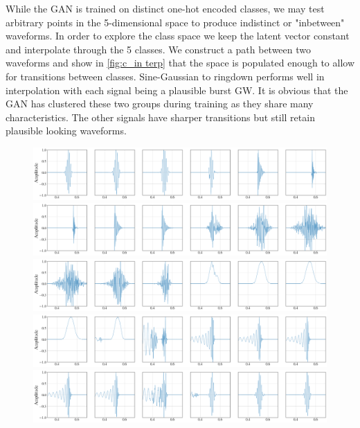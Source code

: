 \documentclass[12pt]{iopart}
\begin{document}
While the \ac{GAN} is trained on distinct one-hot encoded classes, we may test arbitrary points in the 5-dimensional space to produce indistinct or "inbetween" waveforms. In order to explore the class space we keep the latent vector constant and
interpolate through the 5 classes. We construct a path between two waveforms
and show in \cref{fig:c_in	terp} that the space is populated enough to allow for transitions between
classes.  Sine-Gaussian to ringdown performs well in interpolation with each
signal being a plausible burst GW. It is obvious that the GAN has clustered
these two groups during training as they share many characteristics. The other
signals have sharper transitions but still retain plausible looking waveforms. 

\begin{figure}
    \centering
    \includegraphics[width=\textwidth]{figures/generations/sg-rd.png}
    \includegraphics[width=\textwidth]{figures/generations/rd-wnb.png}
    \includegraphics[width=\textwidth]{figures/generations/wnb-blip.png}
    \includegraphics[width=\textwidth]{figures/generations/blip-bbh.png}
    \includegraphics[width=\textwidth]{figures/generations/bbh-sg.png}

\end{figure}
\end{document}
